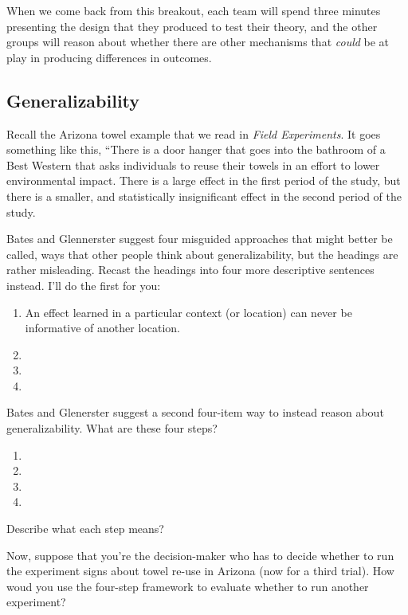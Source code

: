 \documentclass[
]{article}
\providecommand{\tightlist}{%
  \setlength{\itemsep}{0pt}\setlength{\parskip}{0pt}}
\theoremstyle{definition}
\theoremstyle{definition}
\theoremstyle{definition}
\theoremstyle{definition}
\theoremstyle{remark}
\begin{document}
When we come back from this breakout, each team will spend three minutes presenting the design that they produced to test their theory, and the other groups will reason about whether there are other mechanisms that \emph{could} be at play in producing differences in outcomes.

\subsection{Generalizability}\label{generalizability}

Recall the Arizona towel example that we read in \emph{Field Experiments}. It goes something like this, ``There is a door hanger that goes into the bathroom of a Best Western that asks individuals to reuse their towels in an effort to lower environmental impact. There is a large effect in the first period of the study, but there is a smaller, and statistically insignificant effect in the second period of the study.

Bates and Glennerster suggest four misguided approaches that might better be called, ways that other people think about generalizability, but the headings are rather misleading. Recast the headings into four more descriptive sentences instead. I'll do the first for you:

\begin{enumerate}
\def\labelenumi{\arabic{enumi}.}
\tightlist
\item
  An effect learned in a particular context (or location) can never be informative of another location.
\item
\item
\item
\end{enumerate}

Bates and Glenerster suggest a second four-item way to instead reason about generalizability. What are these four steps?

\begin{enumerate}
\def\labelenumi{\arabic{enumi}.}
\tightlist
\item
\item
\item
\item
\end{enumerate}

Describe what each step means?

Now, suppose that you're the decision-maker who has to decide whether to run the experiment signs about towel re-use in Arizona (now for a third trial). How woud you use the four-step framework to evaluate whether to run another experiment?
\end{document}
